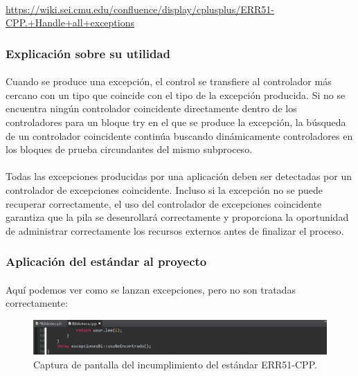 			\paragraph{}\url{https://wiki.sei.cmu.edu/confluence/display/cplusplus/ERR51-CPP.+Handle+all+exceptions}
			
		\subsubsection{Explicación sobre su utilidad}
		
			\paragraph{}Cuando se produce una excepción, el control se transfiere al controlador más cercano con un tipo que coincide con el tipo de la excepción producida. Si no se encuentra ningún controlador coincidente directamente dentro de los controladores para un bloque try en el que se produce la excepción, la búsqueda de un controlador coincidente continúa buscando dinámicamente controladores en los bloques de prueba circundantes del mismo subproceso.
			
			\paragraph{}Todas las excepciones producidas por una aplicación deben ser detectadas por un controlador de excepciones coincidente. Incluso si la excepción no se puede recuperar correctamente, el uso del controlador de excepciones coincidente garantiza que la pila se desenrollará correctamente y proporciona la oportunidad de administrar correctamente los recursos externos antes de finalizar el proceso.
			
		\subsubsection{Aplicación del estándar al proyecto}
		
			\paragraph{}Aquí podemos ver como se lanzan excepciones, pero no son tratadas correctamente:
			
			\begin{figure}[H]
				\centering
				\includegraphics[scale=0.8]{img/img8.png}
				\caption{Captura de pantalla del incumplimiento del estándar ERR51-CPP.}
				\label{img8}
			\end{figure}
		
